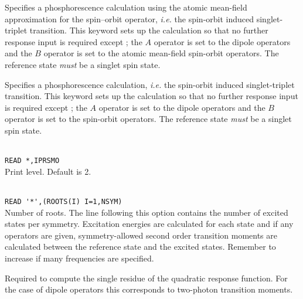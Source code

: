 \begin{description}
\item{}
Specifies a phosphorescence calculation using
the atomic mean-field approximation for the spin--orbit operator, {\it i.e.\/}
the spin-orbit
induced singlet-triplet transition. This keyword sets up the
calculation so that no further response input is required except ; the
$A$ operator is set to the dipole operators and
the $B$ operator
is set to the atomic mean-field spin-orbit
operators.
The reference state {\em must} be a singlet spin state.

\item{}
Specifies a phosphorescence calculation, {\it i.e.\/}
the spin-orbit
induced singlet-triplet transition. This keyword sets up the
calculation so that no further response input is required except ; the
$A$ operator is set to the dipole operators and
the $B$ operator
is set to the spin-orbit
operators. \cite{ovhapjhjajthjojcp97,haovbmaqc27}
The reference state {\em must} be a singlet spin state.

\item{}\\
\verb|READ *,IPRSMO|\\
Print level. Default is 2.

\item{}\\
\verb|READ '*',(ROOTS(I) I=1,NSYM)|\\
Number of roots.  The line following this option contains the number
of excited states per symmetry. Excitation
energies are calculated for each state and if
any operators are given,
symmetry-allowed second order transition moments are
calculated between the
reference state and the excited states.
Remember to increase  if many frequencies are specified.

\item{}
Required to
compute the single residue of the quadratic
response function.
For the case of dipole operators this corresponds to two-photon
transition
moments.


\end{description}
